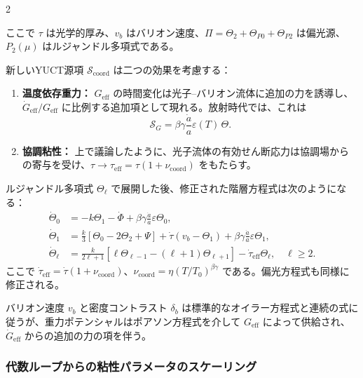 \documentclass[11pt,a4paper]{article}
\begin{document}
	\begin{multicols}{2}
		
		\noindent ここで \(\tau\) は光学的厚み、\(v_b\) はバリオン速度、\(\Pi = \Theta_2 + \Theta_{P0} + \Theta_{P2}\) は偏光源、\(P_2(\mu)\) はルジャンドル多項式である。
		
		新しいYUCT源項 \(\mathcal{S}_{\mathrm{coord}}\) は二つの効果を考慮する：
		\begin{enumerate}
			\item \textbf{温度依存重力：} \(G_{\mathrm{eff}}\) の時間変化は光子–バリオン流体に追加の力を誘導し、\(\dot{G}_{\mathrm{eff}}/G_{\mathrm{eff}}\) に比例する追加項として現れる。放射時代では、これは
			\begin{equation}
				\mathcal{S}_G = \beta\gamma \frac{\dot{a}}{a} \varepsilon(T) \, \Theta.
			\end{equation}
			\item \textbf{協調粘性：} 上で議論したように、光子流体の有効せん断応力は協調場からの寄与を受け、\(\tau \to \tau_{\mathrm{eff}} = \tau (1 + \nu_{\mathrm{coord}})\) をもたらす。
		\end{enumerate}
		
		ルジャンドル多項式 \(\Theta_\ell\) で展開した後、修正された階層方程式は次のようになる：
		\begin{align}
			\dot{\Theta}_0 &= -k\Theta_1 - \dot{\Phi} + \beta\gamma \frac{\dot{a}}{a} \varepsilon \Theta_0, \label{eq:hier0}\\
			\dot{\Theta}_1 &= \frac{k}{3}\left[\Theta_0 - 2\Theta_2 + \Psi\right] + \dot{\tau}(v_b - \Theta_1) + \beta\gamma \frac{\dot{a}}{a} \varepsilon \Theta_1, \label{eq:hier1}\\
			\dot{\Theta}_\ell &= \frac{k}{2\ell+1}\left[\ell\Theta_{\ell-1} - (\ell+1)\Theta_{\ell+1}\right] - \dot{\tau}_{\mathrm{eff}}\Theta_\ell, \quad \ell \ge 2. \label{eq:hier_ell}
		\end{align}
		ここで \(\dot{\tau}_{\mathrm{eff}} = \dot{\tau}(1 + \nu_{\mathrm{coord}})\)、\(\nu_{\mathrm{coord}} = \eta (T/T_0)^{\beta\gamma}\) である。偏光方程式も同様に修正される。
		
		バリオン速度 \(v_b\) と密度コントラスト \(\delta_b\) は標準的なオイラー方程式と連続の式に従うが、重力ポテンシャルはポアソン方程式を介して \(G_{\mathrm{eff}}\) によって供給され、\(\dot{G}_{\mathrm{eff}}\) からの追加の力の項を伴う。
		
		\subsubsection{代数ループからの粘性パラメータのスケーリング}
		\label{subsubsec:viscosity_scaling}
		

\end{multicols}
\end{document}
